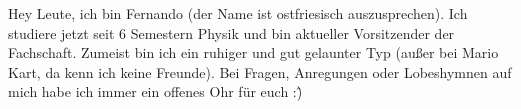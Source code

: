 \begin{multicols*}{2}
{Hey Leute, ich bin Fernando (der Name ist ostfriesisch auszusprechen). Ich studiere jetzt seit 6 Semestern Physik und bin aktueller Vorsitzender der Fachschaft. Zumeist bin ich ein ruhiger und gut gelaunter Typ (außer bei Mario Kart, da kenn ich keine Freunde). Bei Fragen, Anregungen oder Lobeshymnen auf mich habe ich immer ein offenes Ohr für euch :\^)}


\end{multicols*}
